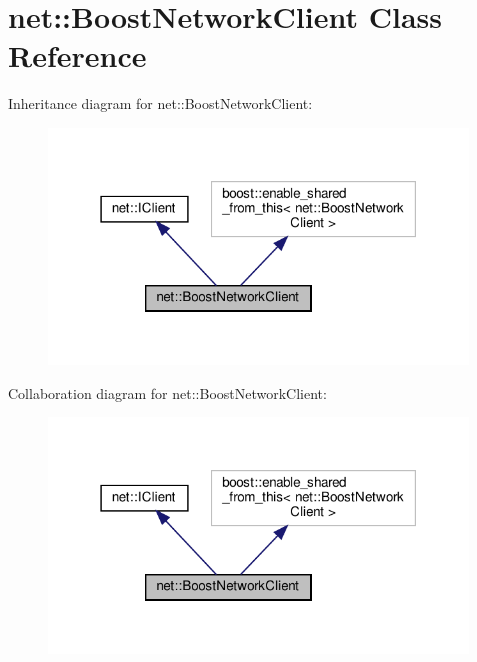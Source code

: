 \hypertarget{classnet_1_1BoostNetworkClient}{}\section{net\+:\+:Boost\+Network\+Client Class Reference}
\label{classnet_1_1BoostNetworkClient}


Inheritance diagram for net\+:\+:Boost\+Network\+Client\+:
\nopagebreak
\begin{figure}[H]
\begin{center}
\leavevmode
\includegraphics[width=316pt]{classnet_1_1BoostNetworkClient__inherit__graph}
\end{center}
\end{figure}


Collaboration diagram for net\+:\+:Boost\+Network\+Client\+:
\nopagebreak
\begin{figure}[H]
\begin{center}
\leavevmode
\includegraphics[width=316pt]{classnet_1_1BoostNetworkClient__coll__graph}
\end{center}
\end{figure}
